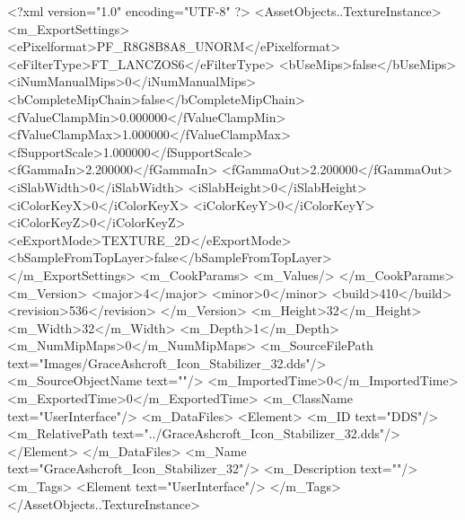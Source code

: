 <?xml version="1.0" encoding="UTF-8" ?>
<AssetObjects..TextureInstance>
	<m_ExportSettings>
		<ePixelformat>PF_R8G8B8A8_UNORM</ePixelformat>
		<eFilterType>FT_LANCZOS6</eFilterType>
		<bUseMips>false</bUseMips>
		<iNumManualMips>0</iNumManualMips>
		<bCompleteMipChain>false</bCompleteMipChain>
		<fValueClampMin>0.000000</fValueClampMin>
		<fValueClampMax>1.000000</fValueClampMax>
		<fSupportScale>1.000000</fSupportScale>
		<fGammaIn>2.200000</fGammaIn>
		<fGammaOut>2.200000</fGammaOut>
		<iSlabWidth>0</iSlabWidth>
		<iSlabHeight>0</iSlabHeight>
		<iColorKeyX>0</iColorKeyX>
		<iColorKeyY>0</iColorKeyY>
		<iColorKeyZ>0</iColorKeyZ>
		<eExportMode>TEXTURE_2D</eExportMode>
		<bSampleFromTopLayer>false</bSampleFromTopLayer>
	</m_ExportSettings>
	<m_CookParams>
		<m_Values/>
	</m_CookParams>
	<m_Version>
		<major>4</major>
		<minor>0</minor>
		<build>410</build>
		<revision>536</revision>
	</m_Version>
	<m_Height>32</m_Height>
	<m_Width>32</m_Width>
	<m_Depth>1</m_Depth>
	<m_NumMipMaps>0</m_NumMipMaps>
	<m_SourceFilePath text="Images/GraceAshcroft_Icon_Stabilizer_32.dds"/>
	<m_SourceObjectName text=""/>
	<m_ImportedTime>0</m_ImportedTime>
	<m_ExportedTime>0</m_ExportedTime>
	<m_ClassName text="UserInterface"/>
	<m_DataFiles>
		<Element>
			<m_ID text="DDS"/>
			<m_RelativePath text="../GraceAshcroft_Icon_Stabilizer_32.dds"/>
		</Element>
	</m_DataFiles>
	<m_Name text="GraceAshcroft_Icon_Stabilizer_32"/>
	<m_Description text=""/>
	<m_Tags>
		<Element text="UserInterface"/>
	</m_Tags>
</AssetObjects..TextureInstance>
